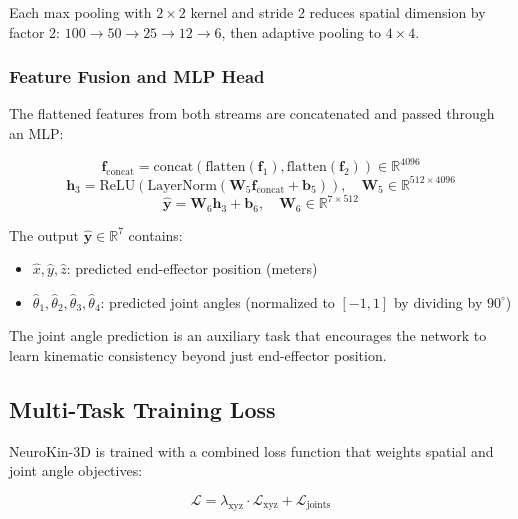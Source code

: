 ﻿\documentclass[12pt,a4paper,oneside]{report}
\begin{document}
Each max pooling with $2 \times 2$ kernel and stride 2 reduces spatial dimension by factor 2: $100 \rightarrow 50 \rightarrow 25 \rightarrow 12 \rightarrow 6$, then adaptive pooling to $4 \times 4$.

\subsubsection{Feature Fusion and MLP Head}

The flattened features from both streams are concatenated and passed through an MLP:

\begin{equation}
\mathbf{f}_{\text{concat}} = \text{concat}(\text{flatten}(\mathbf{f}_1), \text{flatten}(\mathbf{f}_2)) \in \mathbb{R}^{4096}
\end{equation}
\begin{equation}
\mathbf{h}_3 = \text{ReLU}(\text{LayerNorm}(\mathbf{W}_5 \mathbf{f}_{\text{concat}} + \mathbf{b}_5)), \quad \mathbf{W}_5 \in \mathbb{R}^{512 \times 4096}
\end{equation}
\begin{equation}
\hat{\mathbf{y}} = \mathbf{W}_6 \mathbf{h}_3 + \mathbf{b}_6, \quad \mathbf{W}_6 \in \mathbb{R}^{7 \times 512}
\end{equation}

The output $\hat{\mathbf{y}} \in \mathbb{R}^7$ contains:
\begin{itemize}
    \item $\hat{x}, \hat{y}, \hat{z}$: predicted end-effector position (meters)
    \item $\hat{\theta}_1, \hat{\theta}_2, \hat{\theta}_3, \hat{\theta}_4$: predicted joint angles (normalized to $[-1, 1]$ by dividing by $90^\circ$)
\end{itemize}

The joint angle prediction is an auxiliary task that encourages the network to learn kinematic consistency beyond just end-effector position.

\subsection{Multi-Task Training Loss}

NeuroKin-3D is trained with a combined loss function that weights spatial and joint angle objectives:

\begin{equation}
\mathcal{L} = \lambda_{\text{xyz}} \cdot \mathcal{L}_{\text{xyz}} + \mathcal{L}_{\text{joints}}
\end{equation}
\end{document}
